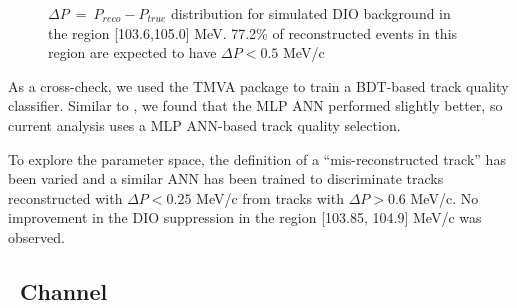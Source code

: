 \begin{figure}
  \caption{
    \label{fig:dio_delta_p_1036_1050} 
    $\Delta P ~=~ P_{reco} -P_{true}$ distribution for simulated DIO background in the region [103.6,105.0] MeV.
    77.2\% of reconstructed events in this region are expected to have $\Delta P < 0.5$ MeV/c
  }
\end{figure}

As a cross-check, we used the TMVA package to train a BDT-based track quality classifier.
Similar to \cite{MU2E_33150_ANN_TRAINING}, we found that the MLP ANN performed slightly better,
so current analysis uses a MLP ANN-based track quality selection.

To explore the parameter space, the definition of a ``mis-reconstructed track'' has been varied and
a similar ANN has been trained to discriminate tracks reconstructed with $\Delta{P} < 0.25$ MeV/c
from tracks with $\Delta{P} > 0.6$ MeV/c. No improvement in the DIO
suppression in the region [103.85, 104.9] MeV/c was observed. 

\newpage
\subsection{\MuToEp\ Channel}
\label{sec:mumep_channel}

